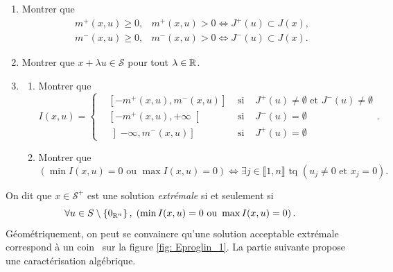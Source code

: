 \begin{enumerate}
  \item Montrer que 
\[
  \begin{aligned}
    &m^+(x,u) \geq 0, &m^+(x,u) > 0 \Leftrightarrow J^+(u)  \subset J(x), \\ 
    &m^-(x,u) \geq 0, &m^-(x,u) > 0 \Leftrightarrow J^-(u)  \subset J(x).
  \end{aligned}
\]

  \item Montrer que $x + \lambda u \in \mathcal{S}$ pour tout $\lambda \in \mathbb{R}$.
  \item 
  \begin{enumerate}
    \item Montrer que 
\[
  I(x,u) =
  \left\lbrace
  \begin{aligned}
    &\left[ -m^+(x,u), m^-(x,u)\right] &\text{ si }& J^+(u)\neq \emptyset \text{ et } J^-(u)\neq \emptyset \\
    &\left[ -m^+(x,u), +\infty\right[ &\text{ si }&  J^-(u) = \emptyset \\
    &\left] -\infty, m^-(x,u)\right] &\text{ si }& J^+(u) = \emptyset 
  \end{aligned}
  \right. .
\]
    \item Montrer que 
\[
  \left( \min I(x,u) = 0 \text{ ou } \max I(x,u) = 0\right)
  \Leftrightarrow
  \exists j \in \llbracket 1,n \rrbracket \text{ tq } \left( u_j \neq 0 \text{ et } x_j = 0\right).
\]

         \end{enumerate}
\end{enumerate}
On dit que $x \in \mathcal{S}^+$ est une solution \emph{extrémale} si et seulement si
\[
  \forall u \in S\setminus \left\lbrace 0_{\mathbb{R}^n} \right\rbrace,\; \left( \min I(x,u) = 0 \text{ ou } \max I(x,u) = 0 \right). 
\]
Géométriquement, on peut se convaincre qu'une solution acceptable extrémale correspond à un \og coin\fg~ sur la figure \ref{fig: Eproglin_1}. La partie suivante propose une caractérisation algébrique.

